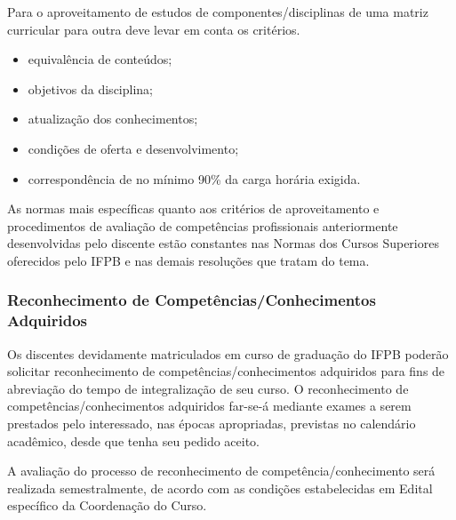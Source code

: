 		Para o aproveitamento de estudos de componentes/disciplinas de uma matriz curricular para outra deve levar em conta os critérios.
	\begin{itemize}
		\item equivalência de conteúdos;
		\item objetivos da disciplina;
		\item atualização dos conhecimentos;
		\item condições de oferta e desenvolvimento;
		\item correspondência de no mínimo 90\% da carga horária exigida.
	\end{itemize}

	As normas mais específicas quanto aos critérios de aproveitamento e procedimentos de avaliação de competências profissionais anteriormente desenvolvidas pelo discente estão constantes nas Normas dos Cursos Superiores oferecidos pelo IFPB e nas demais resoluções que tratam do tema.
	
\subsubsection{Reconhecimento de Competências/Conhecimentos Adquiridos}

	Os discentes devidamente matriculados em curso de graduação do IFPB poderão solicitar reconhecimento de competências/conhecimentos adquiridos para fins de abreviação do tempo de integralização de seu curso. O reconhecimento de competências/conhecimentos adquiridos far-se-á mediante exames a serem prestados pelo interessado, nas épocas apropriadas, previstas no calendário acadêmico, desde que tenha seu pedido aceito.
	
	A avaliação do processo de reconhecimento de competência/conhecimento será realizada semestralmente, de acordo com as condições estabelecidas em Edital específico da Coordenação do Curso. 
	
	
	
	
